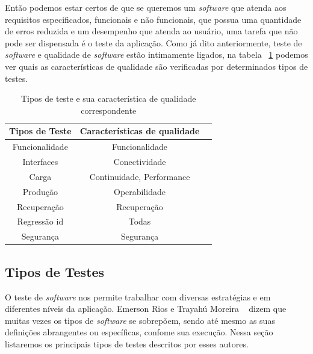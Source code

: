 Então podemos estar certos de que se queremos um \textit{software} que atenda aos requisitos especificados, funcionais e não funcionais, que possua uma quantidade de erros reduzida e um desempenho que atenda ao usuário, uma tarefa que não pode ser dispensada é o teste da aplicação. Como já dito anteriormente, teste de \textit{software} e qualidade de \textit{software} estão intimamente ligados, na tabela ~\ref{tab:testequalidade} podemos ver quais as características de qualidade são verificadas por determinados tipos de testes.

\begin{table}
	\caption{Tipos de teste e sua característica de qualidade correspondente}
	\begin{center}
	\begin{tabular}{ccc}
		\hline
			\textbf{Tipos de Teste} & \textbf{Características de qualidade} \\
		\hline
			Funcionalidade & Funcionalidade \\
			Interfaces & Conectividade \\
			Carga & Continuidade, Performance \\
			Produção & Operabilidade \\
			Recuperação & Recuperação \\
			Regressão id & Todas \\
			Segurança & Segurança \\
		\hline
	\end {tabular}
	\end{center}
	\label{tab:testequalidade}
\end{table}

\subsection{Tipos de Testes}



O teste de \textit{software} nos permite trabalhar com diversas estratégias e em diferentes níveis da aplicação. Emerson Rios e Trayahú Moreira ~\cite{rios2006teste} dizem que muitas vezes os tipos de \textit{software} se sobrepõem, sendo até mesmo as suas definições abrangentes ou específicas, confome sua execução. Nessa seção listaremos os principais tipos de testes descritos por esses autores.

